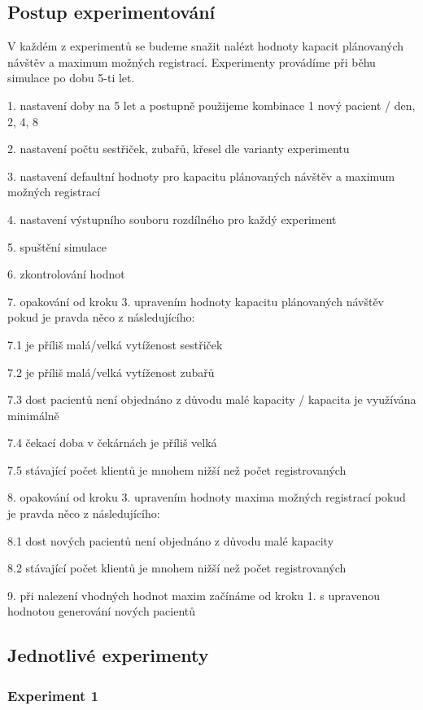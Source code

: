 \documentclass[a4paper,11pt,titlepage]{article}
\begin{document}
\subsection{Postup experimentování}

V každém z experimentů se budeme snažit nalézt hodnoty kapacit plánovaných návštěv a maximum možných registrací. Experimenty provádíme při běhu simulace po dobu 5-ti let.\newline

 1. nastavení doby na 5 let a postupně použijeme kombinace 1 nový pacient / den, 2, 4, 8

 2. nastavení počtu sestřiček, zubařů, křesel dle varianty experimentu

 3. nastavení defaultní hodnoty pro kapacitu plánovaných návštěv a maximum možných registrací

 4. nastavení výstupního souboru rozdílného pro každý experiment

 5. spuštění simulace

 6. zkontrolování hodnot 

 7. opakování od kroku 3. upravením hodnoty kapacitu plánovaných návštěv pokud je pravda něco z následujícího:

	7.1 je příliš malá/velká vytíženost sestřiček

	7.2 je příliš malá/velká vytíženost zubařů

	7.3 dost pacientů není objednáno z důvodu malé kapacity / kapacita je využívána minimálně

	7.4 čekací doba v čekárnách je příliš velká

	7.5 stávající počet klientů je mnohem nižší než počet registrovaných

 8. opakování od kroku 3. upravením hodnoty maxima možných registrací pokud je pravda něco z následujícího:

	8.1 dost nových pacientů není objednáno z důvodu malé kapacity

	8.2 stávající počet klientů je mnohem nižší než počet registrovaných

 9. při nalezení vhodných hodnot maxim začínáme od kroku 1. s upravenou hodnotou generování nových pacientů

\subsection{Jednotlivé experimenty}
\subsubsection{Experiment 1}
\end{document}
